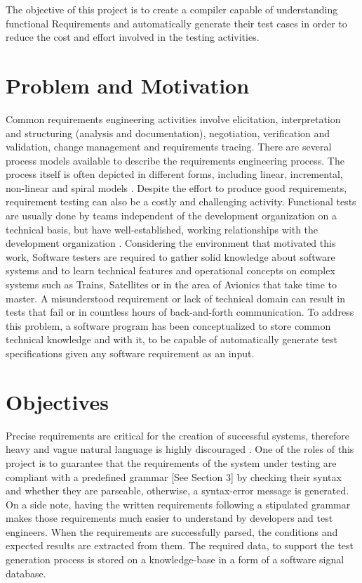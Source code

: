 The objective of this project is to create a compiler capable of understanding functional Requirements and automatically generate their test cases in order to reduce the cost and effort involved in the testing activities. \\


\section{Problem and Motivation}
\label{sec:problem_and_motivation}

Common requirements engineering activities involve elicitation, interpretation and
structuring (analysis and documentation), negotiation, verification and validation,
change management and requirements tracing. There are several process models
available to describe the requirements engineering process. The process itself is
often depicted in different forms, including linear, incremental, non-linear and spiral models \cite{aurum_engineering_2005}.
Despite the effort to produce good requirements, requirement testing can also be a costly and challenging activity. 
Functional tests are usually done by teams independent of the development organization on a technical basis, but have well-established, working relationships with the development organization \cite{noauthor_independent_2013}. Considering the environment that motivated this work, Software testers are required to gather solid knowledge about software systems and to learn technical features and operational concepts on complex systems such as Trains, Satellites or in the area of Avionics that take time to master. A misunderstood requirement or lack of technical domain can result in tests that fail or in countless hours of back-and-forth communication.
To address this problem, a software program has been conceptualized to store common technical knowledge and with it, to be capable of automatically generate test specifications given any software requirement as an input.


\section{Objectives}
\label{sec:objectives}
Precise requirements are critical for the creation of successful systems, therefore heavy and vague natural language is highly discouraged \cite{incose}.
One of the roles of this project is to guarantee that the requirements of the system under testing are compliant with a predefined grammar [See Section 3] by checking their syntax and whether they are parseable, otherwise, a syntax-error message is generated. On a side note, having the written requirements following a stipulated grammar makes those requirements much easier to understand by developers and test engineers.
When the requirements are successfully parsed, the conditions and expected results are extracted from them. The required data, to support the test generation process is stored on a knowledge-base in a form of a software signal database.


